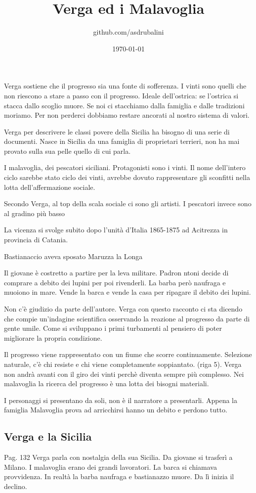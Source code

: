 \documentclass{article}
\title{Verga ed i Malavoglia}
\author{github.com/asdrubalini}
\date{\today}
\begin{document}
    \maketitle

    Verga sostiene che il progresso sia una fonte di sofferenza. I vinti sono quelli che non riescono a stare a passo con il progresso.
    Ideale dell'ostrica: se l'ostrica si stacca dallo scoglio muore. Se noi ci stacchiamo dalla famiglia e dalle tradizioni moriamo. Per non perderci dobbiamo restare ancorati al nostro sistema di valori.

    Verga per descrivere le classi povere della Sicilia ha bisogno di una serie di documenti. Nasce in Sicilia da una famiglia di proprietari terrieri, non ha mai provato sulla sua pelle quello di cui parla.

    I malavoglia, dei pescatori siciliani. Protagonisti sono i vinti. Il nome dell'intero ciclo sarebbe stato ciclo dei vinti, avrebbe dovuto rappresentare gli sconfitti nella lotta dell'affermazione sociale.

    Secondo Verga, al top della scala sociale ci sono gli artisti. I pescatori invece sono al gradino più basso

    La vicenza si svolge subito dopo l'unità d'Italia 1865-1875 ad Acitrezza in provincia di Catania. 

    Bastianaccio aveva sposato Maruzza la Longa

    Il giovane è costretto a partire per la leva militare. Padron ntoni decide di comprare a debito dei lupini per poi rivenderli. La barba però naufraga e muoiono in mare. Vende la barca e vende la casa per ripagare il debito dei lupini.


    Non c'è giudizio da parte dell'autore. Verga con questo racconto ci sta dicendo che compie un'indagine scientifica osservando la reazione al progresso da parte di gente umile. Come si sviluppano i primi turbamenti al pensiero di poter migliorare la propria condizione.

    Il progresso viene rappresentato con un fiume che scorre continuamente. Selezione naturale, c'è chi resiste e chi viene completamente soppiantato. (riga 5).
    Verga non andrà avanti con il giro dei vinti perchè diventa sempre più complesso.
    Nei malavoglia la ricerca del progresso è una lotta dei bisogni materiali.

    I personaggi si presentano da soli, non è il narratore a presentarli.
    Appena la famiglia Malavoglia prova ad arricchirsi hanno un debito e perdono tutto.

    \subsection{Verga e la Sicilia}
    Pag. 132
    Verga parla con nostalgia della sua Sicilia. Da giovane si trasferì a Milano.
    I malavoglia erano dei grandi lavoratori.
    La barca si chiamava provvidenza. In realtà la barba naufraga e bastianazzo muore. Da lì inizia il declino.
\end{document}
